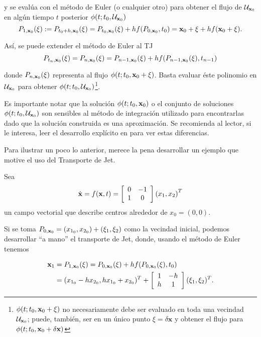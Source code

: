 y se evalúa con el método de Euler (o cualquier otro) para obtener el flujo de $\mathcal{U}_{\mathbf{x}_0}$ en algún tiempo $t$ posterior $\phi(t;t_0,\mathcal{U}_{\mathbf{x}_0} )$
\begin{equation*}
P_{1,\mathbf{x}_0}(\xi) := P_{t_0+h,\mathbf{x}_0}(\xi) = P_{t_0,\mathbf{x}_0}(\xi) + h f(P_{0,\mathbf{x}_0},t_0) = \mathbf{x}_0 + \xi + h f(\mathbf{x}_0 + \xi).
\end{equation*}

Así, se puede extender el método de Euler al TJ 
\begin{equation}
 P_{t_n,\mathbf{x}_0}(\xi) = P_{n,\mathbf{x}_0}(\xi) = P_{n-1,\mathbf{x}_0}(\xi) + h f(P_{n-1,\mathbf{x}_0}(\xi),t_{n-1})
 \label{eq:eulerU}
\end{equation}

donde $P_{n,\mathbf{x}_0}(\xi)$ representa al flujo $\phi(t;t_0,\mathbf{x}_0 + \xi)$. Basta evaluar éste polinomio en $\mathcal{U}_{\mathbf{x}_0}$ para obtener $\phi(t;t_0,\mathcal{U}_{\mathbf{x}_0} )$\footnote{$\phi(t;t_0,\mathbf{x}_0 + \xi)$ no necesariamente debe ser evaluado en toda una vecindad $\mathcal{U}_{\mathbf{x}_0}$; puede, también, ser en un único punto $\xi =\delta \mathbf{x}$ y obtener el flujo para $\phi(t;t_0,\mathbf{x}_0 + \delta \mathbf{x})$}.

Es importante notar que la solución $\phi(t;t_0,\mathbf{x}_0)$ o el conjunto de soluciones $\phi(t;t_0,\mathcal{U}_{\mathbf{x}_0} )$ son sensibles al método de integración utilizado para encontrarlas dado que la solución construida es una aproximación. Se recomienda al lector, si le interesa, leer el desarrollo explícito en \cite{p-palau} para ver estas diferencias.

Para ilustrar un poco lo anterior, merece la pena desarrollar un ejemplo que motive el uso del Transporte de Jet.

Sea
\begin{align}
\dot{\mathbf{x}} = f(\mathbf{x},t) = \left[ \begin{array}{cc}
 0 & -1  \\
 1 & 0  \\
\end{array} \right] \left( x_1, x_2 \right)^T
\label{eq:center}
\end{align}
un campo vectorial que describe centros alrededor de $x_0 = (0,0)$. 

Si se toma $P_{0,\mathbf{x}_0} = (x_{1_0},x_{2_0}) + (\xi_1,\xi_2)$ como la vecindad inicial, podemos desarrollar ``a mano'' el transporte de Jet, donde, usando el método de Euler tenemos

\begin{align*}
\mathbf{x}_1 &= P_{1,\mathbf{x}_0}(\xi) = P_{0,\mathbf{x}_0}(\xi) + h f(P_{0,\mathbf{x}_0}(\xi),t_0) \\
&= (x_{1_0} - h x_{2_0}, h x_{1_0} + x_{2_0} )^T + \left[ \begin{array}{cc}
 1 & -h  \\
h & 1  \\
\end{array} \right] (\xi_1,\xi_2)^T.
\end{align*} 

